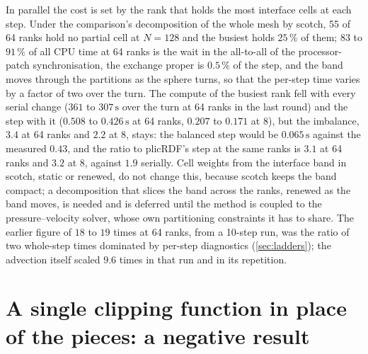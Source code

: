 \documentclass[preprint,12pt]{elsarticle}
\begin{document}
In parallel the cost is set by the rank that holds the most interface cells at each step. Under the comparison's decomposition of the whole mesh by scotch, 55 of 64 ranks hold no partial cell at $N = 128$ and the busiest holds $25\,\%$ of them; $83$ to $91\,\%$ of all CPU time at 64 ranks is the wait in the all-to-all of the processor-patch synchronisation, the exchange proper is $0.5\,\%$ of the step, and the band moves through the partitions as the sphere turns, so that the per-step time varies by a factor of two over the turn. The compute of the busiest rank fell with every serial change ($361$ to $307\,\mathrm{s}$ over the turn at 64 ranks in the last round) and the step with it ($0.508$ to $0.426\,\mathrm{s}$ at 64 ranks, $0.207$ to $0.171$ at 8), but the imbalance, $3.4$ at 64 ranks and $2.2$ at 8, stays: the balanced step would be $0.065\,\mathrm{s}$ against the measured $0.43$, and the ratio to plicRDF's step at the same ranks is $3.1$ at 64 ranks and $3.2$ at 8, against $1.9$ serially. Cell weights from the interface band in scotch, static or renewed, do not change this, because scotch keeps the band compact; a decomposition that slices the band across the ranks, renewed as the band moves, is needed and is deferred until the method is coupled to the pressure--velocity solver, whose own partitioning constraints it has to share. The earlier figure of $18$ to $19$ times at 64 ranks, from a 10-step run, was the ratio of two whole-step times dominated by per-step diagnostics (\cref{sec:ladders}); the advection itself scaled $9.6$ times in that run and in its repetition.

\section{A single clipping function in place of the pieces: a negative result}
\label{sec:joint}
\end{document}
